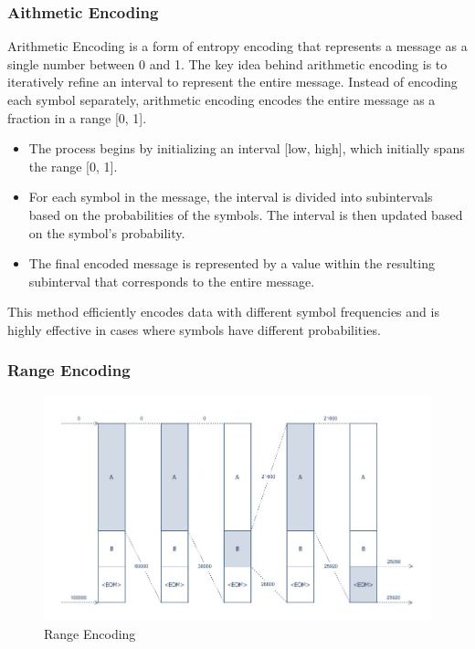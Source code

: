 \documentclass{ioereport}
\begin{document}
    \subsubsection{Aithmetic Encoding}
    Arithmetic Encoding is a form of entropy encoding that represents a message as a single number between 0 and 1. The key idea behind arithmetic encoding is to iteratively refine an interval to represent the entire message. Instead of encoding each symbol separately, arithmetic encoding encodes the entire message as a fraction in a range [0, 1].

    \begin{itemize}
        \item The process begins by initializing an interval [low, high], which initially spans the range [0, 1].
        \item For each symbol in the message, the interval is divided into subintervals based on the probabilities of the symbols. The interval is then updated based on the symbol's probability.
        \item The final encoded message is represented by a value within the resulting subinterval that corresponds to the entire message.
    \end{itemize}

    This method efficiently encodes data with different symbol frequencies and is highly effective in cases where symbols have different probabilities.

    \subsubsection{Range Encoding}

    \begin{figure}[H]
        \centering
        \includegraphics[width=0.95\linewidth]{assets/Range_encoding.jpg}
        \caption{Range Encoding}
        \label{fig:range_encoding}
    \end{figure}
\end{document}
